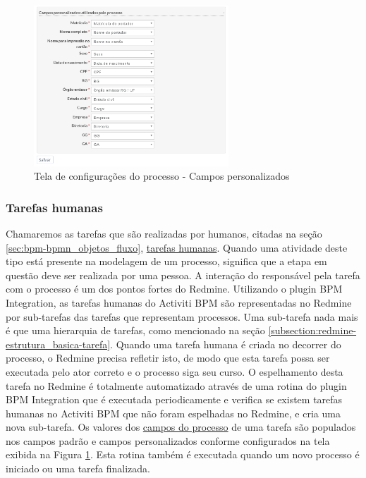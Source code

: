 \begin{figure}[H]
\centering
\includegraphics[width=0.65\textwidth]{imagens/plugin_process_settings2.png}
\caption{Tela de configurações do processo - Campos personalizados}
\label{fig:plugin_process_settings_form_fields}
\end{figure}

\subsubsection{Tarefas humanas}\label{sec:integracao_redmine_activiti_sincronizacao-criacao_human_task}

Chamaremos as tarefas que são realizadas por humanos, citadas na seção \ref{sec:bpm-bpmn_objetos_fluxo}, \underline{tarefas humanas}. Quando uma atividade deste tipo está presente na modelagem de um processo, significa que a etapa em questão deve ser realizada por uma pessoa. A interação do responsável pela tarefa com o processo é um dos pontos fortes do Redmine. Utilizando o plugin BPM Integration, as tarefas humanas do Activiti BPM são representadas no Redmine por sub-tarefas das tarefas que representam processos. Uma sub-tarefa nada mais é que uma hierarquia de tarefas, como mencionado na seção \ref{subsection:redmine-estrutura_basica-tarefa}.
Quando uma tarefa humana é criada no decorrer do processo, o Redmine precisa refletir isto, de modo que esta tarefa possa ser executada pelo ator correto e o processo siga seu curso. O espelhamento desta tarefa no Redmine é totalmente automatizado através de uma rotina do plugin BPM Integration que é executada periodicamente e verifica se existem tarefas humanas no Activiti BPM que não foram espelhadas no Redmine, e cria uma nova sub-tarefa. Os valores dos \underline{campos do processo} de uma tarefa são populados nos campos padrão e campos personalizados conforme configurados na tela exibida na Figura \ref{fig:plugin_process_settings_form_fields}. Esta rotina também é executada quando um novo processo é iniciado ou uma tarefa finalizada.

